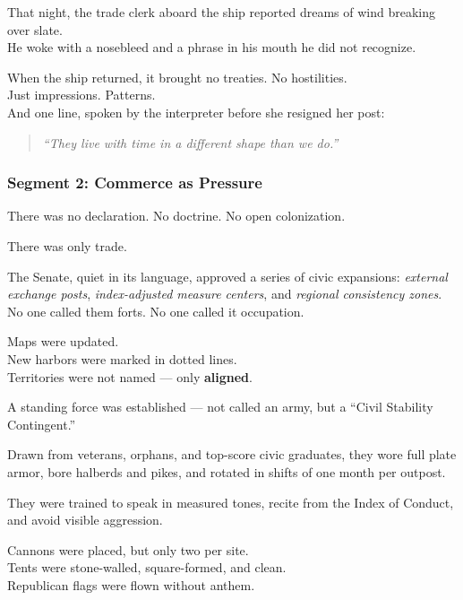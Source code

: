 \documentclass[9pt]{article}
\begin{document}
That night, the trade clerk aboard the ship reported dreams of wind breaking over slate.\\
He woke with a nosebleed and a phrase in his mouth he did not recognize.

\vspace{1em}

When the ship returned, it brought no treaties. No hostilities.\\
Just impressions. Patterns.\\
And one line, spoken by the interpreter before she resigned her post:

\begin{quote}
\textit{“They live with time in a different shape than we do.”}
\end{quote}

\newpage

\subsubsection*{Segment 2: Commerce as Pressure}

There was no declaration. No doctrine. No open colonization.

There was only trade.

The Senate, quiet in its language, approved a series of civic expansions: \textit{external exchange posts}, \textit{index-adjusted measure centers}, and \textit{regional consistency zones}. No one called them forts. No one called it occupation.

Maps were updated.\\
New harbors were marked in dotted lines.\\
Territories were not named — only \textbf{aligned}.

\vspace{1em}

A standing force was established — not called an army, but a ``Civil Stability Contingent.”

Drawn from veterans, orphans, and top-score civic graduates, they wore full plate armor, bore halberds and pikes, and rotated in shifts of one month per outpost.

They were trained to speak in measured tones, recite from the Index of Conduct, and avoid visible aggression.

Cannons were placed, but only two per site.\\
Tents were stone-walled, square-formed, and clean.\\
Republican flags were flown without anthem.
\end{document}
